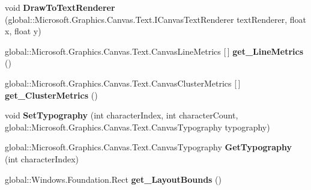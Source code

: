 \begin{DoxyCompactItemize}
\item 
\mbox{\label{class_microsoft_1_1_graphics_1_1_canvas_1_1_text_1_1_canvas_text_layout_ae94965b9797ceb30515e3352cba05fdd}} 
void {\bfseries Draw\+To\+Text\+Renderer} (global\+::\+Microsoft.\+Graphics.\+Canvas.\+Text.\+I\+Canvas\+Text\+Renderer text\+Renderer, float x, float y)
\item 
\mbox{\label{class_microsoft_1_1_graphics_1_1_canvas_1_1_text_1_1_canvas_text_layout_aeb404118734ea91e7bee88ebc313cec1}} 
global\+::\+Microsoft.\+Graphics.\+Canvas.\+Text.\+Canvas\+Line\+Metrics \mbox{[}$\,$\mbox{]} {\bfseries get\+\_\+\+Line\+Metrics} ()
\item 
\mbox{\label{class_microsoft_1_1_graphics_1_1_canvas_1_1_text_1_1_canvas_text_layout_a0d448b366382895fac2e94fc9b2358dd}} 
global\+::\+Microsoft.\+Graphics.\+Canvas.\+Text.\+Canvas\+Cluster\+Metrics \mbox{[}$\,$\mbox{]} {\bfseries get\+\_\+\+Cluster\+Metrics} ()
\item 
\mbox{\label{class_microsoft_1_1_graphics_1_1_canvas_1_1_text_1_1_canvas_text_layout_aae0bff9344ddf4205aab37ecf0fdb8f4}} 
void {\bfseries Set\+Typography} (int character\+Index, int character\+Count, global\+::\+Microsoft.\+Graphics.\+Canvas.\+Text.\+Canvas\+Typography typography)
\item 
\mbox{\label{class_microsoft_1_1_graphics_1_1_canvas_1_1_text_1_1_canvas_text_layout_aa9de23a3678c4be132aa53e6409d9777}} 
global\+::\+Microsoft.\+Graphics.\+Canvas.\+Text.\+Canvas\+Typography {\bfseries Get\+Typography} (int character\+Index)
\item 
\mbox{\label{class_microsoft_1_1_graphics_1_1_canvas_1_1_text_1_1_canvas_text_layout_a772111b2573293b7d5a75e8d2396d598}} 
global\+::\+Windows.\+Foundation.\+Rect {\bfseries get\+\_\+\+Layout\+Bounds} ()
\item 
\mbox{\label{class_microsoft_1_1_graphics_1_1_canvas_1_1_text_1_1_canvas_text_layout_abce87ca208bfa0993ebbf52d11a81671}} 

\end{DoxyCompactItemize}
